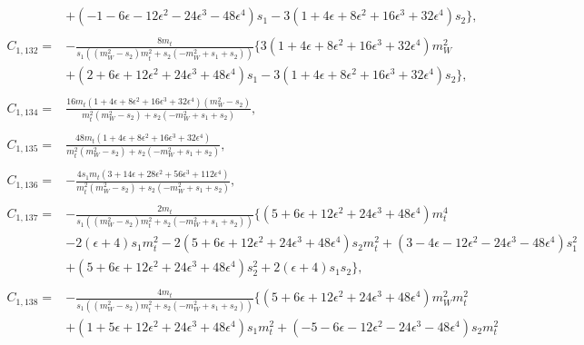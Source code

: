 \documentclass[twocolumn,aps,showpacs,nofootinbib,superscriptaddress,prd]{revtex4-2}
\begin{document}
\begin{widetext}
\begin{align}
\nonumber\\&
+\left(-1 -6 \epsilon -12 \epsilon^2 -24 \epsilon^3 -48 \epsilon^4\right)s_1-3\left(1 +4 \epsilon +8 \epsilon^2 +16 \epsilon^3 +32 \epsilon^4\right)s_2\}
,\nonumber\\
\nonumber\\
C_{1,132}=&-\frac{8m_t}{s_1\left(\left(m_W^2-s_2\right)m_t^2+s_2\left(-m_W^2+s_1+s_2\right)\right)}\{3\left(1 +4 \epsilon +8 \epsilon^2 +16 \epsilon^3 +32 \epsilon^4\right)m_W^2
\nonumber\\&
+\left(2 +6 \epsilon +12 \epsilon^2 +24 \epsilon^3 +48 \epsilon^4\right)s_1-3\left(1 +4 \epsilon +8 \epsilon^2 +16 \epsilon^3 +32 \epsilon^4\right)s_2\}
,\nonumber\\
\nonumber\\
C_{1,134}=&\frac{16m_t\left(1 +4 \epsilon +8 \epsilon^2 +16 \epsilon^3 +32 \epsilon^4\right)\left(m_W^2-s_2\right)}{m_t^2
\left(m_W^2-s_2\right)+s_2\left(-m_W^2+s_1+s_2\right)}
,\nonumber\\
\nonumber\\
C_{1,135}=&\frac{48m_t\left(1 +4 \epsilon +8 \epsilon^2 +16 \epsilon^3 +32 \epsilon^4\right)}{m_t^2\left(m_W^2-s_2\right)+s_2
\left(-m_W^2+s_1+s_2\right)}
,\nonumber\\
\nonumber\\
C_{1,136}=&-\frac{4s_1m_t\left(3 +14 \epsilon +28 \epsilon^2 +56 \epsilon^3 +112 \epsilon^4\right)}{m_t^2\left(m_W^2-s_2\right)+s_2
\left(-m_W^2+s_1+s_2\right)}
,\nonumber\\
\nonumber\\
C_{1,137}=&-\frac{2m_t}{s_1\left(\left(m_W^2-s_2\right)m_t^2+s_2\left(-m_W^2+s_1+s_2\right)\right)}\{\left(5 +6 \epsilon +12 \epsilon^2 +24 \epsilon^3 +48 \epsilon^4\right)m_t^4
\nonumber\\&
-2(\epsilon+4)s_1m_t^2-2\left(5 +6 \epsilon +12 \epsilon^2 +24 \epsilon^3 +48 \epsilon^4\right)s_2m_t^2+\left(3 -4 \epsilon -12 \epsilon^2 -24 \epsilon^3 -48 \epsilon^4\right)s_1^2
\nonumber\\&
+\left(5 +6 \epsilon +12 \epsilon^2 +24 \epsilon^3 +48 \epsilon^4\right)s_2^2+2(\epsilon+4)s_1s_2\}
,\nonumber\\
\nonumber\\
C_{1,138}=&-\frac{4m_t}{s_1\left(\left(m_W^2-s_2\right)m_t^2+s_2\left(-m_W^2+s_1+s_2\right)\right)}\{\left(5 +6 \epsilon +12 \epsilon^2 +24 \epsilon^3 +48 \epsilon^4\right)m_W^2m_t^2
\nonumber\\&
+\left(1 +5 \epsilon +12 \epsilon^2 +24 \epsilon^3 +48 \epsilon^4\right)s_1m_t^2+\left(-5 -6 \epsilon -12 \epsilon^2 -24 \epsilon^3 -48 \epsilon^4\right)s_2m_t^2

\end{align}
\end{widetext}
\end{document}
